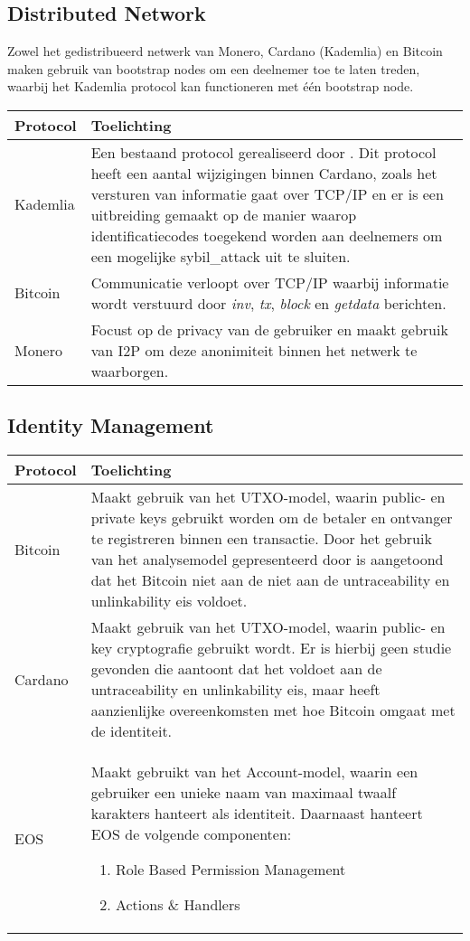 \subsection{Distributed Network}

Zowel het gedistribueerd netwerk van Monero, Cardano (Kademlia) en Bitcoin maken gebruik van bootstrap nodes om een deelnemer toe te laten treden, waarbij het Kademlia protocol kan functioneren met één bootstrap node.

\begin{tabular}{|p{5cm}|p{10cm}|}
  \hline
  \textbf{Protocol} & \textbf{Toelichting} \\
  \hline
  Kademlia & Een bestaand protocol gerealiseerd door \cite{maymounkov2002kademlia}. Dit protocol heeft een aantal wijzigingen binnen Cardano, zoals het versturen van informatie gaat over TCP/IP en er is een uitbreiding gemaakt op de manier waarop identificatiecodes toegekend worden aan deelnemers om een mogelijke \gls{sybil_attack} uit te sluiten. \\
  \hline
  Bitcoin & Communicatie verloopt over TCP/IP waarbij informatie wordt verstuurd door \textit{inv}, \textit{tx}, \textit{block} en \textit{getdata} berichten. \\
  \hline
  Monero & Focust op de privacy van de gebruiker en maakt gebruik van \acrfull{I2P} om deze anonimiteit binnen het netwerk te waarborgen. \\
  \hline
\end{tabular}

\subsection{Identity Management}

\begin{tabular}{|p{5cm}|p{10cm}|}
  \hline
  \textbf{Protocol} & \textbf{Toelichting} \\
  \hline
  Bitcoin & Maakt gebruik van het UTXO-model, waarin public- en private keys gebruikt worden om de betaler en ontvanger te registreren binnen een transactie. Door het gebruik van het analysemodel gepresenteerd door \cite{reid2013analysis} is aangetoond dat het Bitcoin niet aan de niet aan de untraceability en unlinkability eis voldoet. \\
  \hline
  Cardano & Maakt gebruik van het UTXO-model, waarin public- en key cryptografie gebruikt wordt. Er is hierbij geen studie gevonden die aantoont dat het voldoet aan de untraceability en unlinkability eis, maar heeft aanzienlijke overeenkomsten met hoe Bitcoin omgaat met de identiteit. \\
  \hline
  EOS & Maakt gebruikt van het Account-model, waarin een gebruiker een unieke naam van maximaal twaalf karakters hanteert als identiteit. Daarnaast hanteert EOS de volgende componenten:
  \begin{enumerate}
    \item Role Based Permission Management
    \item Actions \& Handlers
  \end{enumerate}
  \\
  \hline
\end{tabular}